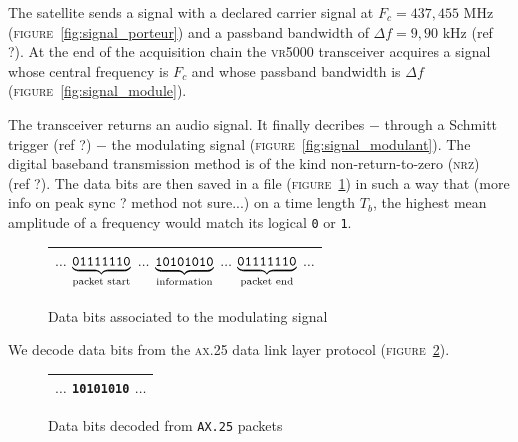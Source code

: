 \documentclass[twocolumn,pre,floats,aps,amsmath,amssymb]{revtex4}
\begin{document}
The satellite sends a signal with a declared carrier signal at $F_c = 437,455$ MHz (\textsc{figure}~\ref{fig:signal_porteur}) and a passband bandwidth of $\Delta f = 9,90$ kHz (ref ?). At the end of the acquisition chain the \textsc{vr5000} transceiver acquires a signal whose central frequency is $F_c$ and whose passband bandwidth is $\Delta f$ (\textsc{figure}~\ref{fig:signal_module}).

The transceiver returns an audio signal. It finally decribes $-$ through a Schmitt trigger (ref ?) $-$ the modulating signal (\textsc{figure}~\ref{fig:signal_modulant}). The digital baseband transmission method is of the kind non-return-to-zero (\textsc{nrz})~\cite{nrz_gorry} (ref ?). The data bits are then saved in a file (\textsc{figure}~\ref{fig:bits_donnees}) in such a way that (more info on peak sync ? method not sure...) on a time length $T_b$, the highest mean amplitude of a frequency would match its logical \texttt{0} or \texttt{1}.


\begin{figure}[h]
  \begin{tabular}{|c|}
    \hline
    $\dots$
    \textcolor{rltred}{$\underbrace{\texttt{01111110}}_{\textup{packet start}}$}
    $\dots$
    \textcolor{rltgreen}{$\underbrace{\texttt{10101010}}_{\textup{information}}$}
    $\dots$
    \textcolor{rltred}{$\underbrace{\texttt{01111110}}_{\textup{packet end}}$}
    $\dots$\\
    \hline
  \end{tabular}
\caption{Data bits associated to the modulating signal}
\label{fig:bits_donnees}
\end{figure}

We decode data bits from the \textsc{ax.25} data link layer protocol (\textsc{figure}~\ref{fig:bits_sans_ax25}).

\begin{figure}[h]
  \begin{tabular}{|c|}
    \hline
    $\dots$ \textcolor{rltgreen}{\texttt{10101010}} $\dots$\\
    \hline
  \end{tabular}
  \caption{Data bits decoded from \texttt{AX.25} packets}
  \label{fig:bits_sans_ax25}
\end{figure}
\end{document}
